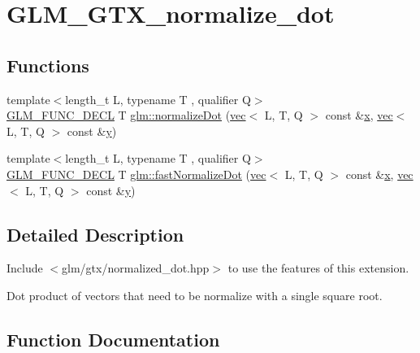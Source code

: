 \hypertarget{group__gtx__normalize__dot}{}\section{G\+L\+M\+\_\+\+G\+T\+X\+\_\+normalize\+\_\+dot}
\label{group__gtx__normalize__dot}
\subsection*{Functions}
\begin{DoxyCompactItemize}
\item 
{\footnotesize template$<$length\+\_\+t L, typename T , qualifier Q$>$ }\\\mbox{\hyperlink{setup_8hpp_ab2d052de21a70539923e9bcbf6e83a51}{G\+L\+M\+\_\+\+F\+U\+N\+C\+\_\+\+D\+E\+CL}} T \mbox{\hyperlink{group__gtx__normalize__dot_gacb140a2b903115d318c8b0a2fb5a5daa}{glm\+::normalize\+Dot}} (\mbox{\hyperlink{structglm_1_1vec}{vec}}$<$ L, T, Q $>$ const \&\mbox{\hyperlink{_s_d_l__opengl_8h_ad0e63d0edcdbd3d79554076bf309fd47}{x}}, \mbox{\hyperlink{structglm_1_1vec}{vec}}$<$ L, T, Q $>$ const \&\mbox{\hyperlink{_s_d_l__opengl_8h_a1675d9d7bb68e1657ff028643b4037e3}{y}})
\item 
{\footnotesize template$<$length\+\_\+t L, typename T , qualifier Q$>$ }\\\mbox{\hyperlink{setup_8hpp_ab2d052de21a70539923e9bcbf6e83a51}{G\+L\+M\+\_\+\+F\+U\+N\+C\+\_\+\+D\+E\+CL}} T \mbox{\hyperlink{group__gtx__normalize__dot_ga2746fb9b5bd22b06b2f7c8babba5de9e}{glm\+::fast\+Normalize\+Dot}} (\mbox{\hyperlink{structglm_1_1vec}{vec}}$<$ L, T, Q $>$ const \&\mbox{\hyperlink{_s_d_l__opengl_8h_ad0e63d0edcdbd3d79554076bf309fd47}{x}}, \mbox{\hyperlink{structglm_1_1vec}{vec}}$<$ L, T, Q $>$ const \&\mbox{\hyperlink{_s_d_l__opengl_8h_a1675d9d7bb68e1657ff028643b4037e3}{y}})
\end{DoxyCompactItemize}


\subsection{Detailed Description}
Include $<$glm/gtx/normalized\+\_\+dot.\+hpp$>$ to use the features of this extension.

Dot product of vectors that need to be normalize with a single square root. 

\subsection{Function Documentation}
\mbox{\label{group__gtx__normalize__dot_ga2746fb9b5bd22b06b2f7c8babba5de9e}} 
